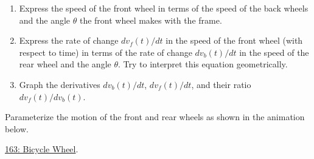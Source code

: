 \documentclass{ximera}
\begin{document}
\begin{exploration}
\begin{enumerate}
\item  Express the speed of the front wheel in terms of the speed of the back wheels and the angle $\theta$ the front wheel makes with the frame.

\item Express the rate of change $dv_f(t)/dt$ in the speed of the front wheel (with respect to time) in terms of the rate of change $dv_b(t)/dt$ in the speed of the rear wheel and the angle $\theta$. Try to interpret this equation geometrically.

\item Graph the derivatives  $dv_b(t)/dt$, $dv_f(t)/dt$, and their ratio $dv_f(t) / dv_b(t)$.



\end{enumerate}
\end{exploration}



\begin{exploration}    \label{Edf4t40t5rtggyt}

Parameterize the motion of the front and rear wheels as shown in the animation below. 


\begin{onlineOnly}
    \begin{center}
\end{center}
\end{onlineOnly}

 
\href{https://www.desmos.com/3d/g4tcwuyqcu}{163: Bicycle Wheel}.

\end{exploration}
\end{document}
